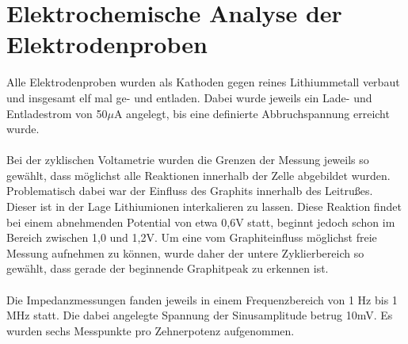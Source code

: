 \documentclass[a4paper, 11pt, headsepline,footsepline,twoside,abstract]{scrbook}
\begin{document}
\section{Elektrochemische Analyse der Elektrodenproben}
\label{elektrochemische_analyse}
Alle Elektrodenproben wurden als Kathoden gegen reines Lithiummetall verbaut und insgesamt elf mal ge- und entladen. Dabei wurde jeweils ein Lade- und Entladestrom von 50$\mu$A angelegt, bis eine definierte Abbruchspannung erreicht wurde.
\\\\
Bei der zyklischen Voltametrie wurden die Grenzen der Messung jeweils so gewählt, dass möglichst alle Reaktionen innerhalb der Zelle abgebildet wurden. Problematisch dabei war der Einfluss des Graphits innerhalb des Leitrußes. Dieser ist in der Lage Lithiumionen interkalieren zu lassen. Diese Reaktion findet bei einem abnehmenden Potential von etwa 0,6V statt, beginnt jedoch schon im Bereich zwischen 1,0 und 1,2V. Um eine vom Graphiteinfluss möglichst freie Messung aufnehmen zu können, wurde daher der untere Zyklierbereich so gewählt, dass gerade der beginnende Graphitpeak zu erkennen ist.
\\\\ %
Die Impedanzmessungen fanden jeweils in einem Frequenzbereich von 1 Hz bis 1 MHz statt. Die dabei angelegte Spannung der Sinusamplitude betrug 10mV. Es wurden sechs Messpunkte pro Zehnerpotenz aufgenommen. %
\newpage
\end{document}
